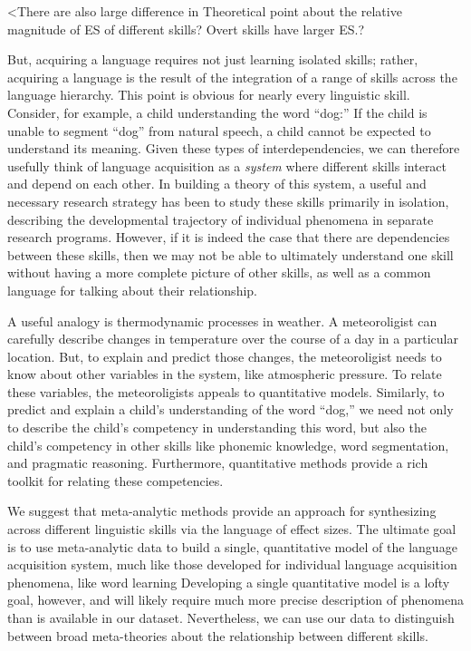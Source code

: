 \documentclass[english,floatsintext,man]{apa6}
\begin{document}
\textless{}There are also large difference in Theoretical point about
the relative magnitude of ES of different skills? Overt skills have
larger ES.?

But, acquiring a language requires not just learning isolated skills;
rather, acquiring a language is the result of the integration of a range
of skills across the language hierarchy. This point is obvious for
nearly every linguistic skill. Consider, for example, a child
understanding the word \enquote{dog:} If the child is unable to segment
\enquote{dog} from natural speech, a child cannot be expected to
understand its meaning. Given these types of interdependencies, we can
therefore usefully think of language acquisition as a \emph{system}
where different skills interact and depend on each other. In building a
theory of this system, a useful and necessary research strategy has been
to study these skills primarily in isolation, describing the
developmental trajectory of individual phenomena in separate research
programs. However, if it is indeed the case that there are dependencies
between these skills, then we may not be able to ultimately understand
one skill without having a more complete picture of other skills, as
well as a common language for talking about their relationship.

A useful analogy is thermodynamic processes in weather. A meteoroligist
can carefully describe changes in temperature over the course of a day
in a particular location. But, to explain and predict those changes, the
meteoroligist needs to know about other variables in the system, like
atmospheric pressure. To relate these variables, the meteoroligists
appeals to quantitative models. Similarly, to predict and explain a
child's understanding of the word \enquote{dog,} we need not only to
describe the child's competency in understanding this word, but also the
child's competency in other skills like phonemic knowledge, word
segmentation, and pragmatic reasoning. Furthermore, quantitative methods
provide a rich toolkit for relating these competencies.

We suggest that meta-analytic methods provide an approach for
synthesizing across different linguistic skills via the language of
effect sizes. The ultimate goal is to use meta-analytic data to build a
single, quantitative model of the language acquisition system, much like
those developed for individual language acquisition phenomena, like word
learning Developing a single quantitative model is a lofty goal,
however, and will likely require much more precise description of
phenomena than is available in our dataset. Nevertheless, we can use our
data to distinguish between broad meta-theories about the relationship
between different skills.
\end{document}
